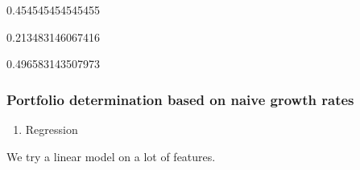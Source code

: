 \documentclass[11pt]{article}
\providecommand{\tightlist}{%
      \setlength{\itemsep}{0pt}\setlength{\parskip}{0pt}}
\begin{document}
    0.454545454545455


    0.213483146067416


    0.496583143507973


    \hypertarget{portfolio-determination-based-on-naive-growth-rates}{%
\subsubsection{Portfolio determination based on naive growth
rates}\label{portfolio-determination-based-on-naive-growth-rates}}

    \begin{enumerate}
\def\labelenumi{\alph{enumi})}
\tightlist
\item
  Regression
\end{enumerate}

We try a linear model on a lot of features.
\end{document}
